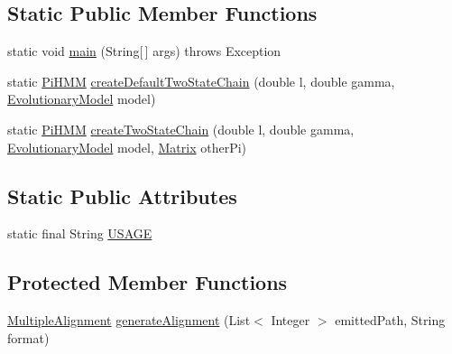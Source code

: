 \subsection*{Static Public Member Functions}
\begin{DoxyCompactItemize}
\item 
static void \hyperlink{classbroad_1_1core_1_1siphy_1_1_pi_h_m_m_a95f6a006e38d7346c711d78afdec2c12}{main} (String\mbox{[}$\,$\mbox{]} args)  throws Exception 
\item 
static \hyperlink{classbroad_1_1core_1_1siphy_1_1_pi_h_m_m}{Pi\+H\+M\+M} \hyperlink{classbroad_1_1core_1_1siphy_1_1_pi_h_m_m_aa83a4e23ba05718dd683cbe7b230464c}{create\+Default\+Two\+State\+Chain} (double l, double gamma, \hyperlink{classbroad_1_1core_1_1siphy_1_1_evolutionary_model}{Evolutionary\+Model} model)
\item 
static \hyperlink{classbroad_1_1core_1_1siphy_1_1_pi_h_m_m}{Pi\+H\+M\+M} \hyperlink{classbroad_1_1core_1_1siphy_1_1_pi_h_m_m_a509a9478700a4bb63d2912a29d0b9bb4}{create\+Two\+State\+Chain} (double l, double gamma, \hyperlink{classbroad_1_1core_1_1siphy_1_1_evolutionary_model}{Evolutionary\+Model} model, \hyperlink{class_jama_1_1_matrix}{Matrix} other\+Pi)
\end{DoxyCompactItemize}
\subsection*{Static Public Attributes}
\begin{DoxyCompactItemize}
\item 
static final String \hyperlink{classbroad_1_1core_1_1siphy_1_1_pi_h_m_m_af8b0ce41f8c843fc6cb6afbe63643953}{U\+S\+A\+G\+E}
\end{DoxyCompactItemize}
\subsection*{Protected Member Functions}
\begin{DoxyCompactItemize}
\item 
\hyperlink{classbroad_1_1core_1_1multiplealignment_1_1_multiple_alignment}{Multiple\+Alignment} \hyperlink{classbroad_1_1core_1_1siphy_1_1_pi_h_m_m_a6fecf2a6ea9381a221e9f59c1afb65e3}{generate\+Alignment} (List$<$ Integer $>$ emitted\+Path, String format)
\end{DoxyCompactItemize}


